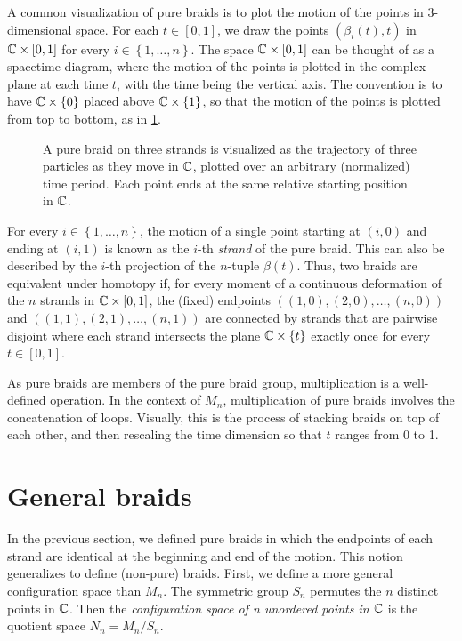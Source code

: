 A common visualization of pure braids is to plot the motion of the points in 3-dimensional space. For each $t\in [0,1]$, we draw the points $\left( \beta_i(t),t \right)$ in $\mathbb{C}\times[0,1]$ for every $i\in\left\{ 1,\dots,n \right\}$. The space $\mathbb{C}\times[0,1]$ can be thought of as a spacetime diagram, where the motion of the points is plotted in the complex plane at each time $t$, with the time being the vertical axis. The convention is to have $\mathbb{C}\times\left\{ 0 \right\}$ placed above $\mathbb{C}\times\left\{ 1 \right\}$, so that the motion of the points is plotted from top to bottom, as in \cref{fig:C_pure_braid}.

\begin{figure}[htbp]
    \centering
    
    \caption{A pure braid on three strands is visualized as the trajectory of three particles as they move in $\mathbb{C}$, plotted over an arbitrary (normalized) time period. Each point ends at the same relative starting position in $\mathbb{C}$.}\label{fig:C_pure_braid}
\end{figure}

For every $i\in\left\{ 1,\dots,n \right\}$, the motion of a single point starting at $(i,0)$ and ending at $(i,1)$ is known as the $i$-th \textit{strand} of the pure braid. This can also be described by the $i$-th projection of the $n$-tuple $\beta(t)$. Thus, two braids are equivalent under homotopy if, for every moment of a continuous deformation of the $n$ strands in $\mathbb{C}\times [0,1]$, the (fixed) endpoints $((1,0),(2,0),\dots,(n,0))$ and $((1,1),(2,1),\dots,(n,1))$ are connected by strands that are pairwise disjoint where each strand intersects the plane $\mathbb{C}\times\left\{ t \right\}$ exactly once for every $t\in[0,1]$.

As pure braids are members of the pure braid group, multiplication is a well-defined operation. In the context of $M_n$, multiplication of pure braids involves the concatenation of loops. Visually, this is the process of stacking braids on top of each other, and then rescaling the time dimension so that $t$ ranges from 0 to 1.

\section{General braids}
In the previous section, we defined pure braids in which the endpoints of each strand are identical at the beginning and end of the motion. This notion generalizes to define (non-pure) braids. First, we define a more general configuration space than $M_n$. The symmetric group $S_n$ permutes the $n$ distinct points in $\mathbb{C}$. Then the \textit{configuration space of n unordered points in $\mathbb{C}$} is the quotient space $N_n = M_n/S_n$.

